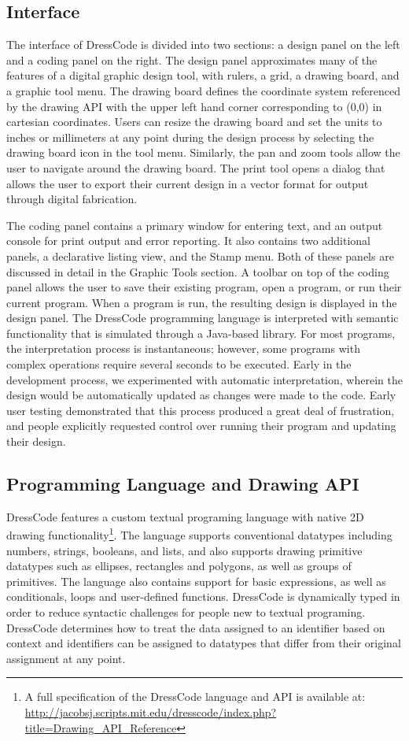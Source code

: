 \documentclass{sigchi}
\begin{document}
\subsection{Interface}
The interface of DressCode is divided into two sections: a design panel on the left and a coding panel on the right. The design panel approximates many of the features of a digital graphic design tool, with rulers, a grid, a drawing board, and a graphic tool menu. The drawing board defines the coordinate system referenced by the drawing API with the upper left hand corner corresponding to (0,0) in cartesian coordinates. Users can resize the drawing board and set the units to inches or millimeters at any point during the design process by selecting the drawing board icon in the tool menu. Similarly, the pan and zoom tools allow the user to navigate around the drawing board. The print tool opens a dialog that allows the user to export their current design in a vector format for output through digital fabrication. 

The coding panel contains a primary window for entering text, and an output console for print output and error reporting. It also contains two additional panels, a declarative listing view, and the Stamp menu. Both of these panels are discussed in detail in the Graphic Tools section. A toolbar on top of the coding panel allows the user to save their existing program, open a program, or run their current program. When a program is run, the resulting design is displayed in the design panel. The DressCode programming language is interpreted with semantic functionality that is simulated through a Java-based library. For most programs, the interpretation process is instantaneous; however, some programs with complex operations require several seconds to be executed. Early in the development process, we experimented with automatic interpretation, wherein the design would be automatically updated as changes were made to the code. Early user testing demonstrated that this process produced a great deal of frustration, and people explicitly requested control over running their program and updating their design.

\subsection{Programming Language and Drawing API}
DressCode features a custom textual programing language with native 2D drawing functionality\footnote{A full specification of the DressCode language and API is available at: \url{http://jacobsj.scripts.mit.edu/dresscode/index.php?title=Drawing_API_Reference}}. The language supports conventional datatypes including numbers, strings, booleans, and lists, and also supports drawing primitive datatypes such as ellipses, rectangles and polygons, as well as groups of primitives. The language also contains support for basic expressions, as well as conditionals, loops and user-defined functions. DressCode is dynamically typed in order to reduce syntactic challenges for people new to textual programing. DressCode determines how to treat the data assigned to an identifier based on context and identifiers can be assigned to datatypes that differ from their original assignment at any point. 
\end{document}

